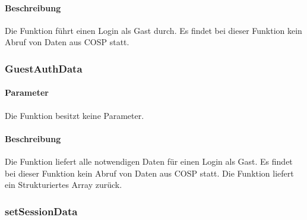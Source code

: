 \paragraph{Beschreibung} Die Funktion führt einen Login als Gast durch. 
Es findet bei dieser Funktion kein Abruf von Daten aus {\glqq COSP\grqq} statt.
\subsubsection{GuestAuthData}
\paragraph{Parameter} Die Funktion besitzt keine Parameter.
\paragraph{Beschreibung} Die Funktion liefert alle notwendigen Daten für einen Login als Gast. 
Es findet bei dieser Funktion kein Abruf von Daten aus {\glqq COSP\grqq} statt. Die Funktion liefert ein Strukturiertes Array zurück.
\subsubsection{setSessionData}
